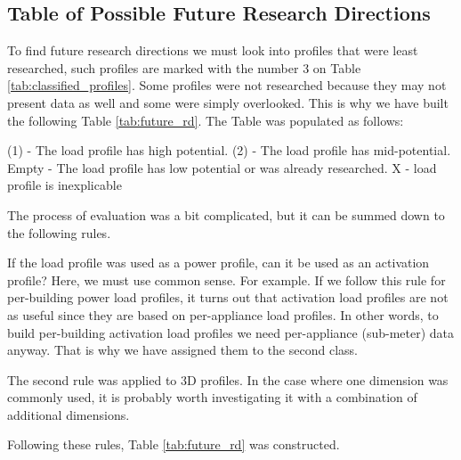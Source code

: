 \subsection{Table of Possible Future Research Directions}

To find future research directions we must look into profiles that were least researched,
such profiles are marked with the number 3 on Table \ref{tab:classified_profiles}.
Some profiles were not researched because they may not present data as well and some were simply overlooked. 
This is why we have built the following Table \ref{tab:future_rd}.
The Table was populated as follows:

\begin{outline} 
\1 (1) - The load profile has high potential. 
\1 (2) - The load profile has mid-potential.
\1 Empty - The load profile has low potential or was already researched.
\1 X - load profile is inexplicable
\end{outline}

The process of evaluation was a bit complicated, but it can be summed down to the following rules.

If the load profile was used as a power profile, can it be used as an activation profile?
Here, we must use common sense.
For example. If we follow this rule for per-building power load profiles, it 
turns out that activation load profiles are not as useful since they are based on per-appliance load profiles.
In other words, to build per-building activation load profiles we need per-appliance (sub-meter) data anyway.
That is why we have assigned them to the second class.

The second rule was applied to 3D profiles.
In the case where one dimension was commonly used, it is probably worth investigating it with a combination of additional dimensions. 

Following these rules, Table  \ref{tab:future_rd} was constructed.


